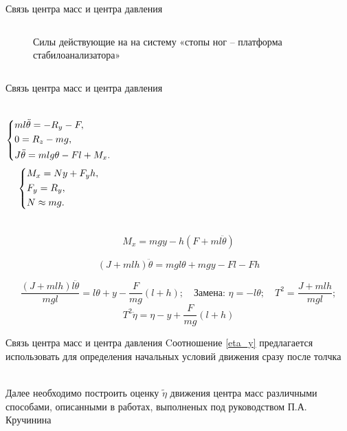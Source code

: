 \documentclass[10pt]{beamer}
\begin{document}
\begin{frame}{Связь центра масс и центра давления\cite{mechmodel}}
\begin{columns}
\begin{figure}[h!]
			\caption{Силы действующие на на систему «стопы ног – платформа стабилоанализатора» }
		\end{figure}
	\end{columns}

\end{frame}

\begin{frame}{Связь центра масс и центра давления}
	\begin{columns}
	\begin{equation}\label{koshisystem}
    \left\{ {\begin{aligned}
                 & ml\ddot{\theta} = -R_y-F , \hfill   \\
                 & 0=R_z-mg, \hfill \\
                 & J \ddot{\theta} = mlg\theta-Fl+M_x . \hfill             \\
            \end{aligned}} \right.
\end{equation}
	\begin{equation}\label{koshisystem}
		\left\{ {\begin{aligned}
					 & M_x = Ny+F_yh , \hfill   \\
					 & F_y = R_y , \hfill \\
					 & N \approx mg . \hfill             \\
				\end{aligned}} \right.
	\end{equation}
\end{columns}

	$$M_x=mgy-h\left(F+ml\ddot{\theta}\right)$$

	$$\left(J+mlh\right)\ddot{\theta}=mgl\theta+mgy-Fl-Fh$$ 


 	$$\frac{(J+mlh)l\ddot{\theta}}{mgl}=l\theta+y-\frac{F}{mg}(l+h);\quad \text{Замена: }\eta=-l\theta; \quad T^2=\frac{J+mlh}{mgl};$$
\begin{equation}\label{eta_y}
	T^2\ddot{\eta}=\eta-y+\frac{F}{mg}(l+h)
\end{equation}

\end{frame}

\begin{frame}{Связь центра масс и центра давления}
	Cоотношение \eqref{eta_y} предлагается использовать для определения начальных условий движения сразу после толчка
	
	\hfill \\
	Далее необходимо построить оценку $\tilde\eta$ движения центра масс различными способами, описанными в работах, выполненых под руководством П.А. Кручинина
\end{frame}
\end{document}

